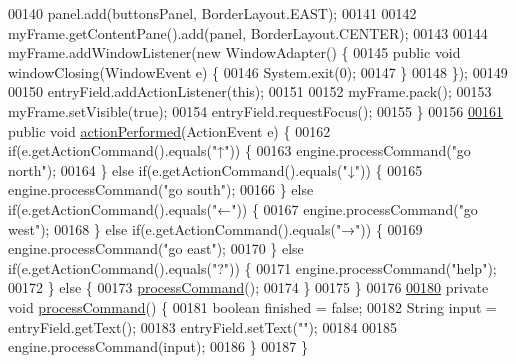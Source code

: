 \begin{DoxyCode}
00140         panel.add(buttonsPanel, BorderLayout.EAST);
00141 
00142         myFrame.getContentPane().add(panel, BorderLayout.CENTER);
00143 
00144         myFrame.addWindowListener(\textcolor{keyword}{new} WindowAdapter() \{
00145             \textcolor{keyword}{public} \textcolor{keywordtype}{void} windowClosing(WindowEvent e) \{
00146                 System.exit(0);
00147             \}
00148         \});
00149 
00150         entryField.addActionListener(\textcolor{keyword}{this});
00151 
00152         myFrame.pack();
00153         myFrame.setVisible(\textcolor{keyword}{true});
00154         entryField.requestFocus();
00155     \}
00156 
\hypertarget{UserInterface_8java_source_l00161}{}\hyperlink{classUserInterface_a0a1ee40a4dbca4aeee002c3d0537c7d5}{00161}     \textcolor{keyword}{public} \textcolor{keywordtype}{void} \hyperlink{classUserInterface_a0a1ee40a4dbca4aeee002c3d0537c7d5}{actionPerformed}(ActionEvent e) \{
00162         \textcolor{keywordflow}{if}(e.getActionCommand().equals(\textcolor{stringliteral}{"↑"})) \{
00163             engine.processCommand(\textcolor{stringliteral}{"go north"});
00164         \} \textcolor{keywordflow}{else} \textcolor{keywordflow}{if}(e.getActionCommand().equals(\textcolor{stringliteral}{"↓"})) \{
00165             engine.processCommand(\textcolor{stringliteral}{"go south"});
00166         \} \textcolor{keywordflow}{else} \textcolor{keywordflow}{if}(e.getActionCommand().equals(\textcolor{stringliteral}{"←"})) \{
00167             engine.processCommand(\textcolor{stringliteral}{"go west"});
00168         \} \textcolor{keywordflow}{else} \textcolor{keywordflow}{if}(e.getActionCommand().equals(\textcolor{stringliteral}{"→"})) \{
00169             engine.processCommand(\textcolor{stringliteral}{"go east"});
00170         \} \textcolor{keywordflow}{else} \textcolor{keywordflow}{if}(e.getActionCommand().equals(\textcolor{stringliteral}{"?"})) \{
00171             engine.processCommand(\textcolor{stringliteral}{"help"});
00172         \} \textcolor{keywordflow}{else} \{
00173             \hyperlink{classUserInterface_a8729aa2e61c87f957663577707f449a5}{processCommand}();
00174         \}
00175     \}
00176 
\hypertarget{UserInterface_8java_source_l00180}{}\hyperlink{classUserInterface_a8729aa2e61c87f957663577707f449a5}{00180}     \textcolor{keyword}{private} \textcolor{keywordtype}{void} \hyperlink{classUserInterface_a8729aa2e61c87f957663577707f449a5}{processCommand}() \{
00181         \textcolor{keywordtype}{boolean} finished = \textcolor{keyword}{false};
00182         String input = entryField.getText();
00183         entryField.setText(\textcolor{stringliteral}{""});
00184 
00185         engine.processCommand(input);
00186     \}
00187 \}
\end{DoxyCode}
